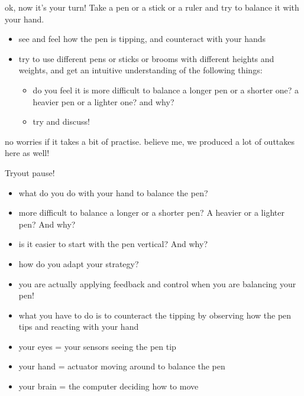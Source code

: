 \begin{frame}
		ok, now it's your turn! Take a pen or a stick or a ruler and try to balance it with your hand. 
		
	\begin{itemize}
		\item see and feel how the pen is tipping, and counteract with your hands
		\item try to use different pens or sticks or brooms with different heights and weights, and get an intuitive understanding of the following things:
			\begin{itemize}
				\item do you feel it is more difficult to balance a longer pen or a shorter one? a heavier pen or a lighter one? and why?
				\item try and discuss!
			\end{itemize}
	\end{itemize}
	no worries if it takes a bit of practise. believe me, we produced a lot of outtakes here as well!
\end{frame}


\begin{frame}{Tryout pause!}
	\begin{itemize}
		\item what do you do with your hand to balance the pen?
		\item more difficult to balance a longer or a shorter pen? A heavier or a lighter pen? And why?
		\item is it easier to start with the pen vertical? And why?
		\item how do you adapt your strategy?
	\end{itemize}
\end{frame}


\begin{frame}
	\begin{itemize}
		\item you are actually applying feedback and control when you are balancing your pen!
		\item what you have to do is to counteract the tipping by observing how the pen tips and reacting with your hand
		\item your eyes = your sensors seeing the pen tip
		\item your hand = actuator moving around to balance the pen
		\item your brain = the computer deciding how to move
		\end{itemize}
	\end{frame}

